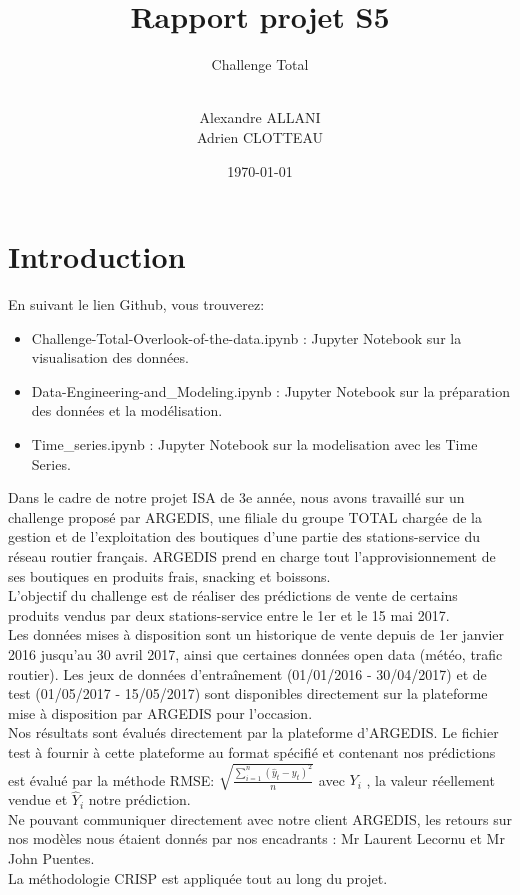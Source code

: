 \documentclass{article} %
\author{\\ Alexandre ALLANI \\
	Adrien CLOTTEAU }
\date{\noexpand\today} %
\title{Rapport projet S5}
\subtitle{Challenge Total}
\begin{document}
	
\imtaMaketitlepage
\tableofcontents
\newpage

\section{Introduction}
En suivant le lien Github, vous trouverez: 
\begin{itemize}
	\item Challenge-Total-Overlook-of-the-data.ipynb : Jupyter Notebook sur la visualisation des données.
	\item Data-Engineering-and\_Modeling.ipynb : Jupyter Notebook sur la préparation des données et la modélisation.
	\item Time\_series.ipynb : Jupyter Notebook sur la modelisation avec les Time Series.
\end{itemize}

Dans le cadre de notre projet ISA de 3e année, nous avons travaillé sur un challenge proposé par ARGEDIS, une filiale du groupe TOTAL chargée de la gestion et de l’exploitation des boutiques d’une partie des stations-service du réseau routier français. ARGEDIS prend en charge tout l’approvisionnement de ses boutiques en produits frais, snacking et boissons.\\
L’objectif du challenge est de réaliser des prédictions de vente de certains produits vendus par deux stations-service entre le 1er et le 15 mai 2017.\\
Les données mises à disposition sont un historique de vente depuis de 1er janvier 2016 jusqu’au 30 avril 2017, ainsi que certaines données open data (météo, trafic routier). Les jeux de données d’entraînement (01/01/2016 - 30/04/2017) et de test (01/05/2017 - 15/05/2017) sont disponibles directement sur la plateforme mise à disposition par ARGEDIS pour l’occasion.\\
Nos résultats sont évalués directement par la plateforme d’ARGEDIS. Le fichier test à fournir à cette plateforme au format spécifié et contenant nos prédictions est évalué par la méthode RMSE: $\sqrt{\frac{\sum_{i=1}^{n}(\hat{y}_t-y_t)^2}{n}}$ avec $Y_i$ , la valeur réellement vendue et $\hat{Y}_i$ notre prédiction. \\
Ne pouvant communiquer directement avec notre client ARGEDIS, les retours sur nos modèles nous étaient donnés par nos encadrants : Mr Laurent Lecornu et Mr John Puentes.\\
La méthodologie CRISP est appliquée tout au long du projet.
\end{document}
